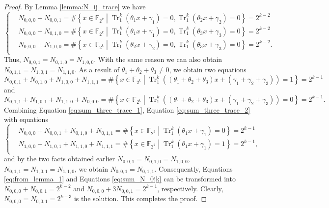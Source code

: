 \documentclass{article}
\newcommand{\F}{\mathbb{F}}
\newcommand{\0}{\textbf{0}}
\newcommand{\1}{\textbf{1}}
\newcommand{\TRACE}{\operatorname{Tr}_1^k}
\theoremstyle{plain}
\begin{document}
    \begin{proof}
        By Lemma \ref{lemma:N_ij_trace} we have
        \begin{equation}\label{eq:from_lemma_1}\left\{\begin{alignedat}{3}
        &N_{0,0,0}+N_{0,0,1}=\#\left\{x\in\F_{2^k}\middle|\TRACE\left(\theta_1x+\gamma_1\right)=0, \TRACE\left(\theta_2x+\gamma_2\right)=0\right\}=2^{k-2}\\
        &N_{0,0,0}+N_{0,1,0}=\#\left\{x\in\F_{2^k}\middle|\TRACE\left(\theta_1x+\gamma_1\right)=0, \TRACE\left(\theta_3x+\gamma_3\right)=0\right\}=2^{k-2}\\
        &N_{0,0,0}+N_{1,0,0}=\#\left\{x\in\F_{2^k}\middle|\TRACE\left(\theta_2x+\gamma_2\right)=0, \TRACE\left(\theta_3x+\gamma_3\right)=0\right\}=2^{k-2}.\\
        \end{alignedat}\right.\end{equation}
        Thus, $N_{0,0,1}=N_{0,1,0}=N_{1,0,0}$. With the same reason we can also obtain  $N_{0,1,1}=N_{1,0,1}=N_{1,1,0}$.
        As a result of $\theta_1+\theta_2+\theta_3\ne 0$, we obtain two equations
        \begin{equation}\label{eq:sum_three_trace_1}
            N_{0,0,1}+N_{0,1,0}+N_{1,0,0}+N_{1,1,1}=\#\left\{x\in\F_{2^k}\middle|\TRACE\left(\left(\theta_1+\theta_2+\theta_3\right)x+\left(\gamma_1+\gamma_2+\gamma_3\right)\right)=1\right\}=2^{k-1}
        \end{equation}
        and 
        \begin{equation}\label{eq:sum_three_trace_2}
            N_{0,1,1}+N_{1,0,1}+N_{1,1,0}+N_{0,0,0}=\#\left\{x\in\F_{2^k}\middle|\TRACE\left(\left(\theta_1+\theta_2+\theta_3\right)x+\left(\gamma_1+\gamma_2+\gamma_3\right)\right)=0\right\}=2^{k-1}.
        \end{equation}
        Combining Equation \eqref{eq:sum_three_trace_1}, Equation \eqref{eq:sum_three_trace_2} with equations
        \begin{equation}\label{eq:sum_N_0jk}\left\{\begin{alignedat}{2}
            &N_{0,0,0}+N_{0,0,1}+N_{0,1,0}+N_{0,1,1}=\#\left\{x\in\F_{2^k}\middle|\TRACE\left(\theta_1x+\gamma_1\right)=0\right\}=2^{k-1}\\
            &N_{1,0,0}+N_{1,0,1}+N_{1,1,0}+N_{1,1,1}=\#\left\{x\in\F_{2^k}\middle|\TRACE\left(\theta_1x+\gamma_1\right)=1\right\}=2^{k-1},\\
        \end{alignedat}\right.\end{equation}
        and by the two facts obtained earlier $N_{0,0,1}=N_{0,1,0}=N_{1,0,0}$, $N_{0,1,1}=N_{1,0,1}=N_{1,1,0}$, we obtain $N_{0,0,1}=N_{0,1,1}$. 
        Consequently, Equations \eqref{eq:from_lemma_1} and Equations \eqref{eq:sum_N_0jk} can be transformed into 
        $N_{0,0,0}+N_{0,0,1}=2^{k-2}$ and $N_{0,0,0}+3N_{0,0,1}=2^{k-1}$, respectively.
        Clearly, $N_{0,0,0}=N_{0,0,1}=2^{k-3}$ is the solution. This completes the proof.
    \end{proof}
\end{document}
